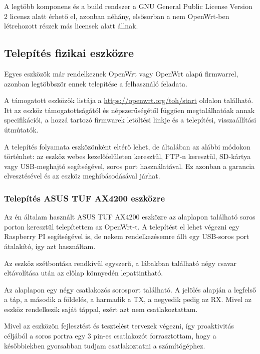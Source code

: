 \documentclass[12pt]{article}
\begin{document}
A legtöbb komponens és a build rendszer a GNU General Public License Version 2 licensz alatt érhető el, azonban néhány, elsősorban a nem OpenWrt-ben létrehozott részek más licensek alatt állnak. \cite{openwrt_about} \cite{openwrt_faq} \cite{openwrt_home}

\subsection{Telepítés fizikai eszközre}

Egyes eszközök már rendelkeznek OpenWrt vagy OpenWrt alapú firmwarrel, azonban legtöbbször ennek telepítése a felhasználó feladata.

A támogatott eszközök listája a \url{https://openwrt.org/toh/start} oldalon található. Itt az eszköz támogatottságától és népszerűségétől függően megtalálhatóak annak specifikációi, a hozzá tartozó firmwarek letöltési linkje és a telepítési, visszaállítási útmútatók.

A telepítés folyamata eszközönként eltérő lehet, de általában az alábbi módokon történhet: az eszköz webes kezelőfelületen keresztül, FTP-n keresztül, SD-kártya vagy USB-meghajtó segítségével, soros port használatával. Ez azonban a garancia elvesztésével és az eszköz meghibásodásával járhat.

\cite{openwrt_install}
\cite{openwrt_stock}

\subsubsection{Telepítés ASUS TUF AX4200 eszközre}

Az én általam használt ASUS TUF AX4200 eszközre az alaplapon található soros porton keresztül telepítettem az OpenWrt-t. A telepítést el lehet végezni egy Raspberry PI segítségével is, de nekem rendelkezésemre állt egy USB-soros port átalakító, így azt használtam. \cite{asus_ax4200}

Az eszköz szétbontása rendkívül egyszerű, a lábakban található négy csavar eltávolítása után az előlap könnyedén lepattintható.

Az alaplapon egy négy csatlakozós sorosport található. A jelölés alapján a legfelső a táp, a második a földelés, a harmadik a TX, a negyedik pedig az RX. Mivel az eszköz rendelkezik saját táppal, ezért azt nem csatlakoztattam.

Mivel az eszközön fejlesztést és tesztelést tervezek végezni, így proaktivitás céljából a soros portra egy 3 pin-es csatlakozót forrasztottam, hogy a későbbiekben gyorsabban tudjam csatlakoztatni a számítógéphez.
\end{document}
